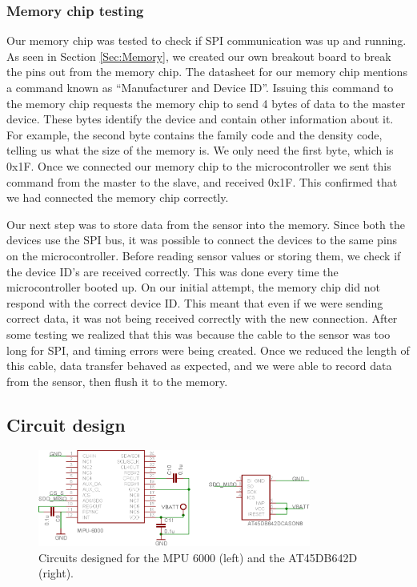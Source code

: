 \subsubsection{Memory chip testing}
\label{Sec:MemoryTesting}
Our memory chip was tested to check if SPI communication was up and running.
As seen in Section \ref{Sec:Memory},
we created our own breakout board to break the pins out from the memory chip.
The datasheet for our memory chip mentions a command known as ``Manufacturer and Device ID''.
Issuing this command to the memory chip requests the memory chip to send 4 bytes of data to the master device.
These bytes identify the device and contain other information about it. 
For example, the second byte contains the family code and the density code,
telling us what the size of the memory is.
We only need the first byte, which is 0x1F.
Once we connected our memory chip to the microcontroller we sent this command from the master to the slave,
and received 0x1F.
This confirmed that we had connected the memory chip correctly.

Our next step was to store data from the sensor into the memory.
Since both the devices use the SPI bus,
it was possible to connect the devices to the same pins on the microcontroller.
Before reading sensor values or storing them,
we check if the device ID's are received correctly.
This was done every time the microcontroller booted up.
On our initial attempt, the memory chip did not respond with the correct device ID.
This meant that even if we were sending correct data,
it was not being received correctly with the new connection.
After some testing we realized that this was because the cable to the sensor was too long for SPI,
and timing errors were being created.
Once we reduced the length of this cable,
data transfer behaved as expected,
and we were able to record data from the sensor,
then flush it to the memory.

\subsection{Circuit design}
\label{Sec:CircuitDesign}

\begin{figure}
\begin{center}
\includegraphics[width=0.8\textwidth]{images/MPU6000Circuit.eps}
\caption{Circuits designed for the MPU 6000 (left) and the AT45DB642D (right).}
\label{Fig:MPUCkt}
\end{center}
\end{figure}

